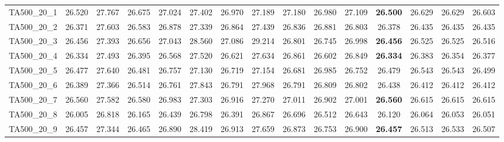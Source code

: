 \begin{tabular}{cc||ccccccccccccc}
TA500\_20\_1       & 26.520           & 27.767           & 26.675           & 27.024           & 27.402           & 26.970           & 27.189           & 27.180           & 26.980           & 27.109           & {\bf 26.500}     & 26.629           & 26.629           & 26.603          \\ 
TA500\_20\_2       & 26.371           & 27.603           & 26.583           & 26.878           & 27.339           & 26.864           & 27.439           & 26.836           & 26.881           & 26.803           & 26.378           & 26.435           & 26.435           & 26.435          \\ 
TA500\_20\_3       & 26.456           & 27.393           & 26.656           & 27.043           & 28.560           & 27.086           & 29.214           & 26.801           & 26.745           & 26.998           & {\bf 26.456}     & 26.525           & 26.525           & 26.516          \\ 
TA500\_20\_4       & 26.334           & 27.493           & 26.395           & 26.568           & 27.520           & 26.621           & 27.634           & 26.861           & 26.602           & 26.849           & {\bf 26.334}     & 26.383           & 26.354           & 26.377          \\ 
TA500\_20\_5       & 26.477           & 27.640           & 26.481           & 26.757           & 27.130           & 26.719           & 27.154           & 26.681           & 26.985           & 26.752           & 26.479           & 26.543           & 26.543           & 26.499          \\ 
TA500\_20\_6       & 26.389           & 27.366           & 26.514           & 26.761           & 27.843           & 26.791           & 27.968           & 26.791           & 26.809           & 26.802           & 26.438           & 26.412           & 26.412           & 26.412          \\ 
TA500\_20\_7       & 26.560           & 27.582           & 26.580           & 26.983           & 27.303           & 26.916           & 27.270           & 27.011           & 26.902           & 27.001           & {\bf 26.560}     & 26.615           & 26.615           & 26.615          \\ 
TA500\_20\_8       & 26.005           & 26.818           & 26.165           & 26.439           & 26.798           & 26.391           & 26.867           & 26.696           & 26.512           & 26.643           & 26.120           & 26.064           & 26.053           & 26.051          \\ 
TA500\_20\_9       & 26.457           & 27.344           & 26.465           & 26.890           & 28.419           & 26.913           & 27.659           & 26.873           & 26.753           & 26.900           & {\bf 26.457}     & 26.513           & 26.533           & 26.507          \\ 
\end{tabular}